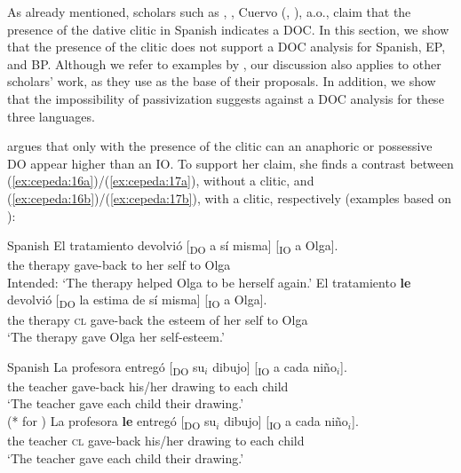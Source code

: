 \documentclass[output=paper,colorlinks,citecolor=brown,nonflat]{./langscibook}
\begin{document}
As already mentioned, scholars such as \citet{Demonte1995}, \citet{Bleam2003}, Cuervo (\citeyear{Cuervo2003}, \citeyear{Cuervo2010Proceedings}), a.o., claim that the presence of the dative clitic in Spanish indicates a DOC. In this section, we show that the presence of the clitic does not support a DOC analysis for Spanish, EP, and BP. Although we refer to examples by \citet{Demonte1995}, our discussion also applies to other scholars’ work, as they use \citet{Demonte1995} as the base of their proposals. In addition, we show that the impossibility of passivization suggests against a DOC analysis for these three languages.

\citet{Demonte1995} argues that only with the presence of the clitic can an anaphoric or possessive DO appear higher than an IO. To support her claim, she finds a contrast between (\ref{ex:cepeda:16a})/(\ref{ex:cepeda:17a}), without a clitic, and (\ref{ex:cepeda:16b})/(\ref{ex:cepeda:17b}), with a clitic, respectively (examples based on \citeauthor{Demonte1995}):

\newpage 

\ea%
    \label{ex:cepeda:16} Spanish
	\ea\label{ex:cepeda:16a}
	\gll El tratamiento devolvió [\textsubscript{DO} a sí  misma] [\textsubscript{IO} a Olga].\\
		the therapy      gave-back \hspaceThis{[\textsubscript{DO}} to her self \hspaceThis{[\textsubscript{IO}} to Olga\\
	\glt Intended: ‘The therapy helped Olga to be herself again.’
	\ex\label{ex:cepeda:16b}
	\gll El tratamiento \textbf{le} devolvió [\textsubscript{DO} la estima  de sí  misma] [\textsubscript{IO} a Olga].\\
		the therapy \textsc{cl} gave-back \hspaceThis{[\textsubscript{DO}} the esteem of her self \hspaceThis{[\textsubscript{IO}} to Olga\\
	\glt ‘The therapy gave Olga her self-esteem.’
	\z
\z

\ea%
    \label{ex:cepeda:17} 
    Spanish
	\ea\label{ex:cepeda:17a}
	\gll La  profesora entregó [\textsubscript{DO} su$_i$ dibujo] [\textsubscript{IO} a  cada  niño$_i$].\\
		the teacher gave-back \hspaceThis{[\textsubscript{DO}} his/her drawing \hspaceThis{[\textsubscript{IO}} to each child\\
	\glt ‘The teacher gave each child their drawing.’\\
			(* for \citeauthor{Demonte1995})
	\ex\label{ex:cepeda:17b}
	\gll  La  profesora \textbf{le} entregó [\textsubscript{DO} su$_i$ dibujo] [\textsubscript{IO} a  cada  niño$_i$].\\
		the teacher \textsc{cl}  gave-back \hspaceThis{[\textsubscript{DO}} his/her drawing \hspaceThis{[\textsubscript{IO}} to each child\\
	\glt ‘The teacher gave each child their drawing.’
	\z
\z
\end{document}
